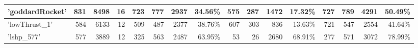 \begin{table}[]
{\begin{tabular}{|l|r|r|r|r|r|r|r|r|r|r|r|r|r|r|r|}
\hline
'goddardRocket'     & 831                                                     & 8498                                                & 16                                                       & 723                     & 777                     & 2937                                                                          & 34.56\%                                                                          & 575                     & 287                     & 1472                                                                           & 17.32\%                                                                          & 727                     & 789                     & 4291                                                                           & 50.49\%                                                                           \\ 
\hline
'lowThrust\_1'                & 584                                                     & 6133                                                & 12                                                       & 509                     & 487                     & 2377                                                                          & 38.76\%                                                                          & 607                     & 303                     & 836                                                                            & 13.63\%                                                                          & 721                     & 547                     & 2554                                                                           & 41.64\%                                                                           \\ 
\hline
'lshp\_577'                   & 577                                                     & 3889                                                & 12                                                       & 325                     & 563                     & 2487                                                                          & 63.95\%                                                                          & 53                      & 26                      & 2680                                                                           & 68.91\%                                                                          & 277                     & 571                     & 3072                                                                           & 78.99\%                                                                           \\ 

\end{tabular}}
\end{table}
